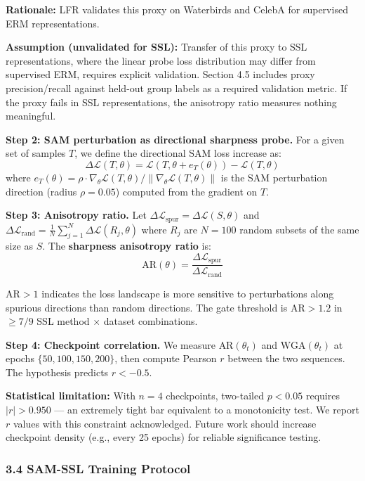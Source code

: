 \textbf{Rationale:} LFR \citep{ghaznavi2023lfr} validates this proxy on Waterbirds and CelebA for supervised ERM representations.

\textbf{Assumption (unvalidated for SSL):} Transfer of this proxy to SSL representations, where the linear probe loss distribution may differ from supervised ERM, requires explicit validation. Section 4.5 includes proxy precision/recall against held-out group labels as a required validation metric. If the proxy fails in SSL representations, the anisotropy ratio measures nothing meaningful.

\textbf{Step 2: SAM perturbation as directional sharpness probe.}
For a given set of samples $T$, we define the directional SAM loss increase as:
$$\Delta\mathcal{L}(T, \theta) = \mathcal{L}(T, \theta + e_T(\theta)) - \mathcal{L}(T, \theta)$$
where $e_T(\theta) = \rho \cdot \nabla_\theta \mathcal{L}(T, \theta) / \|\nabla_\theta \mathcal{L}(T, \theta)\|$ is the SAM perturbation direction (radius $\rho = 0.05$) computed from the gradient on $T$.

\textbf{Step 3: Anisotropy ratio.}
Let $\Delta\mathcal{L}_{\text{spur}} = \Delta\mathcal{L}(S, \theta)$ and $\Delta\mathcal{L}_{\text{rand}} = \frac{1}{N}\sum_{j=1}^{N}\Delta\mathcal{L}(R_j, \theta)$ where $R_j$ are $N=100$ random subsets of the same size as $S$. The \textbf{sharpness anisotropy ratio} is:
$$\text{AR}(\theta) = \frac{\Delta\mathcal{L}_{\text{spur}}}{\Delta\mathcal{L}_{\text{rand}}}$$

$\text{AR} > 1$ indicates the loss landscape is more sensitive to perturbations along spurious directions than random directions. The gate threshold is $\text{AR} > 1.2$ in $\geq 7/9$ SSL method $\times$ dataset combinations.

\textbf{Step 4: Checkpoint correlation.}
We measure $\text{AR}(\theta_t)$ and $\text{WGA}(\theta_t)$ at epochs $\{50, 100, 150, 200\}$, then compute Pearson $r$ between the two sequences. The hypothesis predicts $r < -0.5$.

\textbf{Statistical limitation:} With $n=4$ checkpoints, two-tailed $p<0.05$ requires $|r|>0.950$ --- an extremely tight bar equivalent to a monotonicity test. We report $r$ values with this constraint acknowledged. Future work should increase checkpoint density (e.g., every 25 epochs) for reliable significance testing.

\subsubsection{3.4 SAM-SSL Training Protocol}

